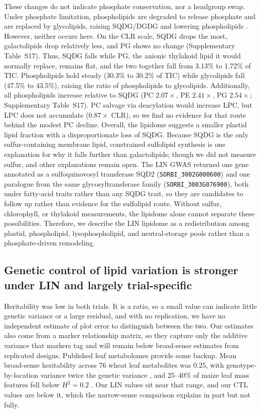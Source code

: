 \documentclass[9pt,twocolumn,twoside]{rilabRxiv}
\begin{document}
These changes do not indicate phosphate conservation, nor a headgroup swap. Under phosphate limitation, phospholipids are degraded to release phosphate and are replaced by glycolipids, raising SQDG/DGDG and lowering phospholipids \citep{Essigmann1998, Hartel2000, Jouhet2004, KellyDormann2002, Pfaff2020}. However, neither occurs here. On the CLR scale, SQDG drops the most, galactolipids drop relatively less, and PG shows no change (Supplementary Table~S17). Thus, SQDG falls while PG, the anionic thylakoid lipid it would normally replace, remains flat, and the two together fall from 3.13\% to 1.72\% of TIC. Phospholipids hold steady (30.3\% to 30.2\% of TIC) while glycolipids fall (47.5\% to 43.5\%), raising the ratio of phospholipids to glycolipids. Additionally, all phospholipids increase relative to SQDG (PC $2.07\times$, PE $2.41\times$, PG $2.54\times$; Supplementary Table~S17). PC salvage via deacylation would increase LPC, but LPC does not accumulate ($0.87\times$ CLR), so we find no evidence for that route behind the modest PC decline. Overall, the lipidome suggests a smaller plastid lipid fraction with a disproportionate loss of SQDG. Because SQDG is the only sulfur-containing membrane lipid, constrained sulfolipid synthesis is one explanation for why it falls further than galactolipids; though we did not measure sulfur, and other explanations remain open. The LIN GWAS returned one gene annotated as a sulfoquinovosyl transferase SQD2 (\texttt{SORBI\_3002G000600}) and one paralogue from the same glycosyltransferase family (\texttt{SORBI\_3003G076900}), both under fatty-acid traits rather than any SQDG trait, so they are candidates to follow up rather than evidence for the sulfolipid route. Without sulfur, chlorophyll, or thylakoid measurements, the lipidome alone cannot separate these possibilities. Therefore, we describe the LIN lipidome as a redistribution among plastid, phospholipid, lysophospholipid, and neutral-storage pools rather than a phosphate-driven remodeling.


\subsection*{Genetic control of lipid variation is stronger under LIN and largely trial-specific}

Heritability was low in both trials. It is a ratio, so a small value can indicate little genetic variance or a large residual, and with no replication, we have no independent estimate of plot error to distinguish between the two. Our estimates also come from a marker relationship matrix, so they capture only the additive variance that markers tag and will remain below broad-sense estimates from replicated designs. Published leaf metabolomes provide some backup. Mean broad-sense heritability across 76 wheat leaf metabolites was 0.25, with genotype-by-location variance twice the genetic variance \citep{Matros2017}, and 25--40\% of maize leaf mass features fell below $H^2=0.2$ \citep{Zhou2019}. Our LIN values sit near that range, and our CTL values are below it, which the narrow-sense comparison explains in part but not fully.
\end{document}
